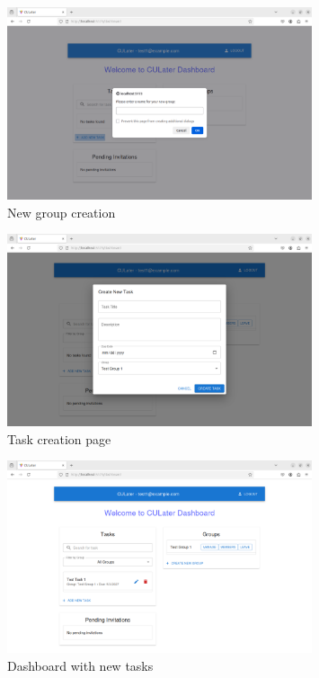 \documentclass{scrreprt}
\begin{document}
\begin{figure}[htbp]
        \centering
        \includegraphics[width=0.8\textwidth]{task_create_no_group_new_group_creation.png}
	\caption{New group creation}
	\label{fig:my_label}
\end{figure}

\begin{figure}[htbp]
        \centering
        \includegraphics[width=0.8\textwidth]{task_creation_page.png}
	\caption{Task creation page}
	\label{fig:my_label}
\end{figure}
\begin{figure}[htbp]
        \centering
        \includegraphics[width=0.8\textwidth]{dashboard_new_task.png}
	\caption{Dashboard with new tasks}
	\label{fig:my_label}
\end{figure}
\end{document}
